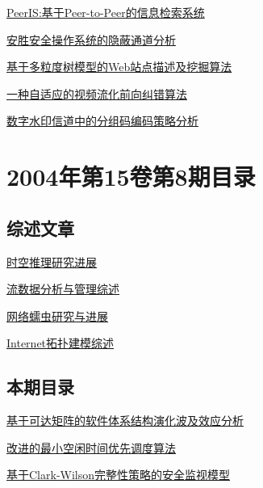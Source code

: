 \documentclass[a4paper]{article}
\begin{document}
\href{http://www.jos.org.cn/ch/reader/download_pdf.aspx?file_no=20040911&year_id=2004&quarter_id=9&falg=1}{PeerIS:基于Peer-to-Peer的信息检索系统}

\href{http://www.jos.org.cn/ch/reader/download_pdf.aspx?file_no=20040912&year_id=2004&quarter_id=9&falg=1}{安胜安全操作系统的隐蔽通道分析}

\href{http://www.jos.org.cn/ch/reader/download_pdf.aspx?file_no=20040913&year_id=2004&quarter_id=9&falg=1}{基于多粒度树模型的Web站点描述及挖掘算法}

\href{http://www.jos.org.cn/ch/reader/download_pdf.aspx?file_no=20040914&year_id=2004&quarter_id=9&falg=1}{一种自适应的视频流化前向纠错算法}

\href{http://www.jos.org.cn/ch/reader/download_pdf.aspx?file_no=20040915&year_id=2004&quarter_id=9&falg=1}{数字水印信道中的分组码编码策略分析}


\section{\textbf{2004年第15卷第8期目录}}
\subsection{综述文章}
\href{http://www.jos.org.cn/ch/reader/download_pdf.aspx?file_no=20040805&year_id=2004&quarter_id=8&falg=1}{时空推理研究进展}

\href{http://www.jos.org.cn/ch/reader/download_pdf.aspx?file_no=20040809&year_id=2004&quarter_id=8&falg=1}{流数据分析与管理综述}

\href{http://www.jos.org.cn/ch/reader/download_pdf.aspx?file_no=20040813&year_id=2004&quarter_id=8&falg=1}{网络蠕虫研究与进展}

\href{http://www.jos.org.cn/ch/reader/download_pdf.aspx?file_no=20040814&year_id=2004&quarter_id=8&falg=1}{Internet拓扑建模综述}

\subsection{本期目录}
\href{http://www.jos.org.cn/ch/reader/download_pdf.aspx?file_no=20040801&year_id=2004&quarter_id=8&falg=1}{基于可达矩阵的软件体系结构演化波及效应分析}

\href{http://www.jos.org.cn/ch/reader/download_pdf.aspx?file_no=20040802&year_id=2004&quarter_id=8&falg=1}{改进的最小空闲时间优先调度算法}

\href{http://www.jos.org.cn/ch/reader/download_pdf.aspx?file_no=20040803&year_id=2004&quarter_id=8&falg=1}{基于Clark-Wilson完整性策略的安全监视模型}
\end{document}
